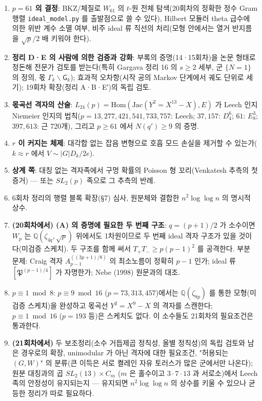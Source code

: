 \begin{enumerate}
\def\labelenumi{\arabic{enumi}.}
\tightlist
\item
  \textbf{\(p=61\) 의 결정}: BKZ/체질로 \(W_{61}\) 의 \(t\)-원 전체 탐색(20회차의 정확한 정수 Gram 행렬 \texttt{ideal\_model.py} 를 출발점으로 쓸 수 있다), Hilbert 모듈러 theta 급수에 의한 위반 계수 소멸 여부, 비주 ideal 류 직선의 처리(모형 안에서는 열거 반지름을 \(\sqrt p/2\) 배 키워야 한다).
\item
  \textbf{정리 D·E 의 사람에 의한 검증과 강화}: 부록의 증명(14·15회차)을 논문 형태로 정돈해 전문가 검토를 받는다(특히 Gargava 정리 16 의 \(s\ge2\) 세부, 군 \(\{N=1\}\) 의 정의, 몫 \(\Gamma_k\backslash\mathsf G_k\)); 효과적 오차항(시작 공의 Markov 단계에서 궤도 단위로 세기); 19회차 확장(정리 A·B·E′)의 독립 검토.
\item
  \textbf{몫곡선 격자의 산술}: \(L_{24}(p)=\mathrm{Hom}(\mathrm{Jac}(Y^2=X^{13}-X),E)\) 가 Leech 인지 Niemeier 인지의 법칙(\(p=13,277,421,541,733,757\): Leech; \(37,157\): \(D_4^6\); \(61\): \(E_8^3\); \(397,613\): 근 720개), 그리고 \(p\ge61\) 에서 \(N(q')\ge9\) 의 증명.
\item
  \textbf{\(r\) 이 커지는 체제}: 대각합 없는 잡음 변형으로 호흡 모드 손실을 제거할 수 있는가(\(k\approx r\) 에서 \(V\sim|G|D_k/2e\)).
\item
  \textbf{상계 쪽}: 대칭 없는 격자족에서 구멍 확률의 Poisson 형 꼬리(Venkatesh 추측의 첫 증거) --- 또는 \(SL_2(p)\) 족으로 그 추측의 반례.
\item
  6회차 정리의 행렬 블록 확장(§7) 심사, 원분체와 결합한 \(n^2\log\log n\) 의 명시적 상수.
\item
  \textbf{(20회차에서) (A) 의 증명에 필요한 두 번째 구조}: \(q=(p+1)/2\) 가 소수이면 \(W_p\) 는 \(\mathbb Q(\zeta_{4q},\sqrt p)\) 위에서도 1차원이므로 두 번째 ideal 격자 구조가 있을 것이다(미검증 스케치). 두 구조를 함께 써서 \(T_+T_-\ge p(p-1)^2\) 를 공격한다. 부분 문제: Craig 격자 \(A_{p-1}^{((3p+1)/8)}\) 의 최소노름이 정확히 \(p-1\) 인가; ideal 류 \([\mathfrak P^{(p-1)/4}]\) 가 자명한가; Nebe (1998) 원문과의 대조.
\item
  \textbf{\(p\equiv1\bmod8\)}: \(p\equiv9\bmod16\) (\(p=73,313,457\))에서는 \(\mathbb Q(\zeta_{8p})\) 를 통한 모형(미검증 스케치)을 완성하고 몫곡선 \(Y^2=X^9-X\) 의 격자를 스캔한다; \(p\equiv1\bmod16\) (\(p=193\) 등)은 스케치도 없다. 이 소수들도 21회차의 필요조건은 통과한다.
\item
  \textbf{(21회차에서)} 두 보조정리(소수 거듭제곱 정칙성, 올별 정칙성)의 독립 검토와 남은 경우로의 확장, unimodular 가 아닌 격자에 대한 필요조건, "허용되는 \((G,W)\)" 의 분류(큰 이득은 서로 켤레인 자유 토러스가 많은 군에서만 나온다); 원분 대칭과의 곱 \(SL_2(13)\times C_m\) (\(m\) 은 홀수이고 \(3\cdot7\cdot13\) 과 서로소)에서 Leech 족의 안정성이 유지되는지 --- 유지되면 \(n^2\log\log n\) 의 상수를 키울 수 있으나 균등한 정리가 따로 필요하다.
\end{enumerate}


